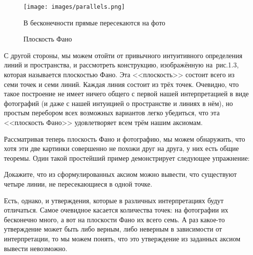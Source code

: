 \begin{figure}[H]
\centering
\texttt{[image: images/parallels.png]}
\caption{В бесконечности прямые пересекаются на фото}
\end{figure}

\begin{figure}[H]
\centering
{}
\caption{Плоскость Фано}
\end{figure}

С другой стороны, мы можем отойти от привычного интуитивного определения линий и пространства, и рассмотреть конструкцию, изображённую на~рис.1.3, которая называется плоскостью Фано. Эта <<плоскость>> состоит всего из семи точек и семи линий. Каждая линия состоит из трёх точек. Очевидно, что такое построение не имеет ничего общего с первой нашей интерпретацией в виде фотографий (и даже с нашей интуицией о пространстве и линиях в нём), но простым перебором всех возможных вариантов легко убедиться, что эта <<плоскость Фано>> удовлетворяет всем трём нашим аксиомам.

Рассматривая теперь плоскость Фано и фотографию, мы можем обнаружить, что хотя эти две картинки совершенно не похожи друг на друга, у них есть общие теоремы. Один такой простейший пример демонстрирует следующее упражнение:

\begin{exercise}
Докажите, что из сформулированных аксиом можно вывести, что существуют четыре линии, не пересекающиеся в одной точке.
\end{exercise}

Есть, однако, и утверждения, которые в различных интерпретациях будут отличаться. Самое очевидное касается количества точек: на фотографии их бесконечно много, а вот на плоскости Фано их всего семь. А раз какое-то утверждение может быть либо верным, либо неверным в зависимости от интерпретации, то мы можем понять, что это утверждение из заданных аксиом вывести невозможно.

